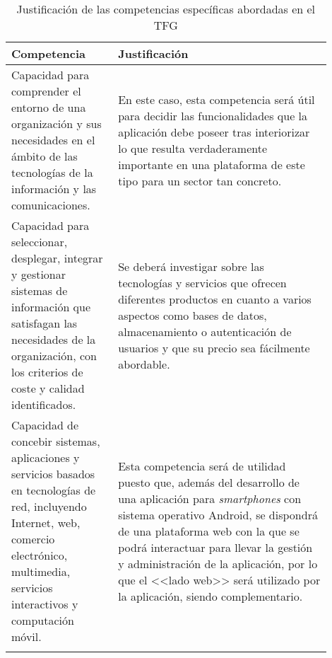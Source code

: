\documentclass{pre-tfg}
\begin{document}
\begin{table}[hp]
	\centering
	\caption{Justificación de las competencias específicas abordadas en el TFG}
	\label{tab:competencias}
	
	\begin{tabular}{p{0.3\linewidth}p{0.6\linewidth}}
		\textbf{Competencia} & \textbf{Justificación} \\
		\hline
		
			Capacidad para comprender el entorno de una organización y sus necesidades en el
			ámbito de las tecnologías de la información y las comunicaciones. & En este caso, esta competencia será útil para decidir las funcionalidades que la aplicación debe poseer tras interiorizar lo que resulta verdaderamente importante en una plataforma de este tipo para un sector tan concreto. \\
			
			Capacidad para seleccionar, desplegar, integrar y gestionar sistemas de información
			que satisfagan las necesidades de la organización, con los criterios de coste y calidad
			identificados. & Se deberá investigar sobre las tecnologías y servicios que ofrecen diferentes productos en cuanto a varios aspectos como bases de datos, almacenamiento o autenticación de usuarios y que su precio sea fácilmente abordable. \\
			
			Capacidad de concebir sistemas, aplicaciones y servicios basados en tecnologías de
			red, incluyendo Internet, web, comercio electrónico, multimedia, servicios interactivos
			y computación móvil. & Esta competencia será de utilidad puesto que, además del desarrollo de una aplicación para \textit{smartphones} con sistema operativo Android, se dispondrá de una plataforma web con la que se podrá interactuar para llevar la gestión y administración de la aplicación, por lo que el <<lado web>> será utilizado por la aplicación, siendo complementario.\\
			& \\
		\hline
	\end{tabular}

\end{table}
\end{document}
